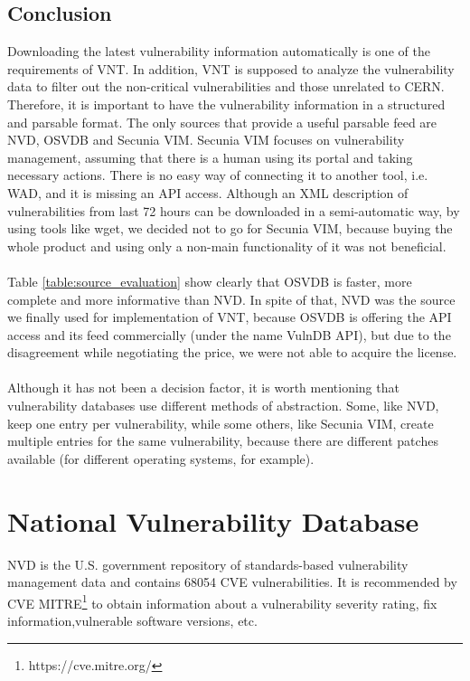 \subsection{Conclusion}
Downloading the latest vulnerability information automatically is one of the requirements of VNT. In addition, VNT is supposed to analyze the vulnerability data to filter out the non-critical vulnerabilities and those unrelated to CERN. Therefore, it is important to have the vulnerability information in a structured and parsable format. 
The only sources that provide a useful parsable feed are NVD, OSVDB and Secunia VIM. Secunia VIM focuses on vulnerability management, assuming that there is a human using its portal and taking necessary actions. There is no easy way of connecting it to another tool, i.e. WAD, and it is missing an API access. Although an XML description of vulnerabilities from last 72 hours can be downloaded in a semi-automatic way, by using tools like wget, we decided not to go for Secunia VIM, because buying the whole product and using only a non-main functionality of it was not beneficial.
\paragraph{}
Table \ref{table:source_evaluation} show clearly that OSVDB is faster, more complete and more informative than NVD. In spite of that, NVD was the source we finally used for implementation of VNT, because OSVDB is offering the API access and its feed commercially (under the name VulnDB API), but due to the disagreement while negotiating the price, we were not able to acquire the license.
\paragraph{}
Although it has not been a decision factor, it is worth mentioning that vulnerability databases use different methods of abstraction. Some, like NVD, keep one entry per vulnerability, while some others, like Secunia VIM, create multiple entries for the same vulnerability, because there are different patches available (for different operating systems, for example).

\section{National Vulnerability Database}
NVD is the U.S. government repository of standards-based vulnerability management data and contains 68054 CVE vulnerabilities. It is recommended by CVE MITRE\footnote{https://cve.mitre.org/} to obtain information about a vulnerability severity rating, fix information,vulnerable software versions, etc. 
 
